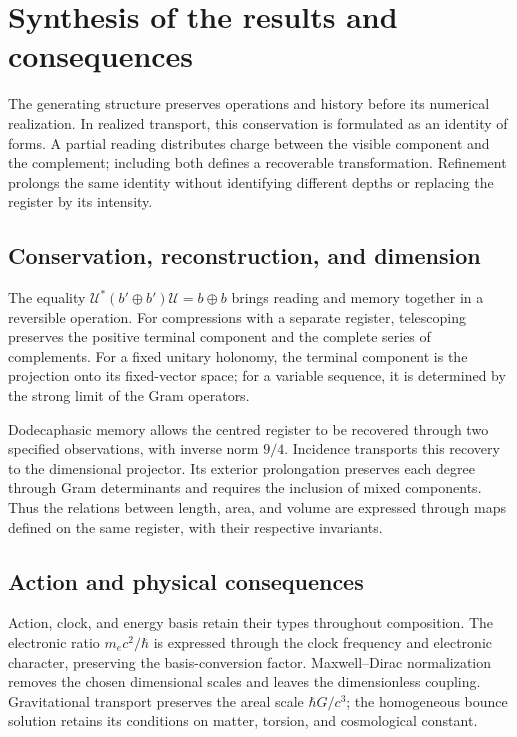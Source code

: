 \section{Synthesis of the results and consequences}
\label{nuclear:sintesis}
The generating structure preserves operations and history before its numerical realization. In realized transport, this conservation is formulated as an identity of forms. A partial reading distributes charge between the visible component and the complement; including both defines a recoverable transformation. Refinement prolongs the same identity without identifying different depths or replacing the register by its intensity.

\subsection{Conservation, reconstruction, and dimension}
The equality \(\mathcal U^*(b'\oplus b')\mathcal U=b\oplus b\) brings reading and memory together in a reversible operation. For compressions with a separate register, telescoping preserves the positive terminal component and the complete series of complements. For a fixed unitary holonomy, the terminal component is the projection onto its fixed-vector space; for a variable sequence, it is determined by the strong limit of the Gram operators.

Dodecaphasic memory allows the centred register to be recovered through two specified observations, with inverse norm \(9/4\). Incidence transports this recovery to the dimensional projector. Its exterior prolongation preserves each degree through Gram determinants and requires the inclusion of mixed components. Thus the relations between length, area, and volume are expressed through maps defined on the same register, with their respective invariants.

\subsection{Action and physical consequences}
Action, clock, and energy basis retain their types throughout composition. The electronic ratio \(m_ec^2/\hbar\) is expressed through the clock frequency and electronic character, preserving the basis-conversion factor. Maxwell--Dirac normalization removes the chosen dimensional scales and leaves the dimensionless coupling. Gravitational transport preserves the areal scale \(\hbar G/c^3\); the homogeneous bounce solution retains its conditions on matter, torsion, and cosmological constant.

